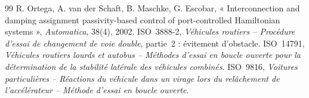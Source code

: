 \documentclass[11pt,a4paper]{article}
\begin{document}
\begin{thebibliography}{99}
 R. Ortega, A. van der Schaft, B. Maschke, G. Escobar, « Interconnection and damping assignment passivity-based control of port-controlled Hamiltonian systems », \emph{Automatica}, 38(4), 2002.
 ISO~3888-2, \emph{Véhicules routiers -- Procédure d'essai de changement de voie double}, partie~2 : évitement d'obstacle.
 ISO~14791, \emph{Véhicules routiers lourds et autobus -- Méthodes d'essai en boucle ouverte pour la détermination de la stabilité latérale des véhicules combinés}.
 ISO~9816, \emph{Voitures particulières -- Réactions du véhicule dans un virage lors du relâchement de l'accélérateur -- Méthode d'essai en boucle ouverte}.
\end{thebibliography}
\end{document}
